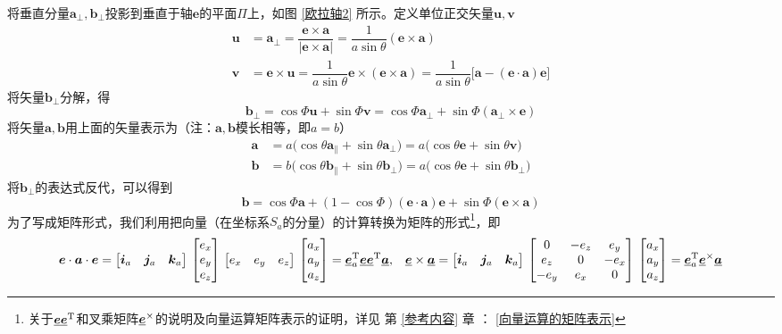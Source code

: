 将垂直分量$\bm{a}_{\perp}, \bm{b}_{\perp}$投影到垂直于轴$\bm{e}$的平面$\Pi$上，如图 \ref{欧拉轴2} 所示。定义单位正交矢量$\bm{u}, \bm{v}$
\begin{align*}
	\bm{u} & = \bm{a}_{\perp} = \dfrac{\bm{e} \times \bm{a}}{\big| \bm{e} \times \bm{a} \big|} = \dfrac{1}{a \sin \theta}(\bm{e} \times \bm{a}) \\
	\bm{v} & = \bm{e} \times \bm{u} = \dfrac{1}{a \sin \theta} \bm{e} \times (\bm{e} \times \bm{a})= \dfrac{1}{a \sin \theta}\big[ \bm{a} - (\bm{e} \cdot \bm{a})\bm{e} \big] 
\end{align*}
将矢量$\bm{b}_{\perp}$分解，得
\begin{equation*}
	\bm{b}_{\perp} = \cos \varPhi \bm{u} + \sin \varPhi \bm{v} = \cos \varPhi \bm{a}_\perp + \sin \varPhi (\bm{a}_\perp \times \bm{e})
\end{equation*}
将矢量$\bm{a}, \bm{b}$用上面的矢量表示为（注：$\bm{a}, \bm{b}$模长相等，即$a=b$）
\begin{align}
	\bm{a} & = a \big( \cos \theta \bm{a}_{\parallel} + \sin \theta \bm{a}_{\perp} \big) 
	= a \big( \cos \theta \bm{e} + \sin \theta \bm{v} \big) \\
	\bm{b} & = b \big( \cos \theta \bm{b}_{\parallel} + \sin \theta \bm{b}_{\perp} \big) 
	= a \big( \cos \theta \bm{e} + \sin \theta \bm{b}_{\perp} \big)
\end{align}
将$\bm{b}_{\perp}$的表达式反代，可以得到
\begin{equation}
	\bm{b} = \cos \varPhi \bm{a} + ( 1 - \cos \varPhi ) (\bm{e} \cdot \bm{a})\bm{e} + \sin \varPhi(\bm{e} \times \bm{a})
\end{equation}
为了写成矩阵形式，我们利用把向量（在坐标系$S_a$的分量）的计算转换为矩阵的形式\footnote[1]{关于$\underline{\bm{e}}\underline{\bm{e}}^{\text{T}}$和叉乘矩阵$\underline{\bm{e}}^\times$的说明及向量运算矩阵表示的证明，详见 第 \ref{参考内容} 章 ： \ref{向量运算的矩阵表示} \link[向量运算的矩阵表示]}，即
\begin{align*}
	\bm{e} \cdot \bm{a} \cdot \bm{e} = 
	\big[ \bm{i}_a \quad \bm{j}_a \quad \bm{k}_a \big] \,
	\begin{bmatrix}
		e_x \\
		e_y \\
		e_z
	\end{bmatrix}
	\,
	\big[ e_x \quad e_y \quad e_z \big]
	\,
	\begin{bmatrix}
		a_x \\
		a_y \\
		a_z
	\end{bmatrix}
	= \underline{\bm{e}}_a^{\text{T}} \underline{\bm{e}} \underline{\bm{e}}^\text{T} \underline{\bm{a}},
	&& \underline{\bm{e}} \times \underline{\bm{a}} =
	\big[ \bm{i}_a \quad \bm{j}_a \quad \bm{k}_a \big] \,
	\begin{bmatrix}
		0 & -e_z & e_y \\
		e_z & 0 & -e_x \\
		-e_y & e_x & 0
	\end{bmatrix}
	\,
	\begin{bmatrix}
		a_x \\
		a_y \\
		a_z
	\end{bmatrix}
	= \underline{\bm{e}}_a^{\text{T}} \underline{\bm{e}}^\times \underline{\bm{a}}
\end{align*}
